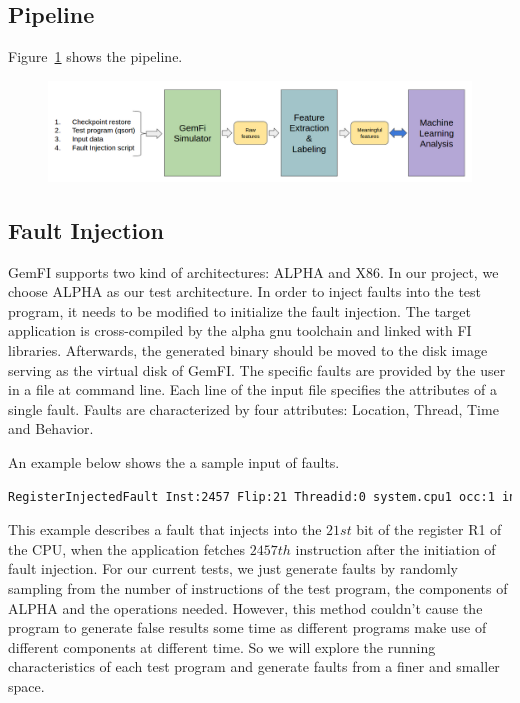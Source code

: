 \documentclass{sig-alternate}
\begin{document}
\subsection{Pipeline}
Figure~\ref{fig:pipeline} shows the pipeline.
\begin{figure}[t]
\begin{center}
   \includegraphics[width=0.95\linewidth]{./figures/pipeline.png}
\end{center}
   \caption{}
\label{fig:pipeline}
\end{figure}

\subsection{Fault Injection}
GemFI \cite{parasyris2014gemfi} supports two kind of architectures: ALPHA and X86. In our project, we choose ALPHA as our test architecture. In order to inject faults into the test program, it needs to be modified to initialize the fault injection. The target application is cross-compiled by the alpha gnu toolchain and linked with FI libraries. Afterwards, the generated binary should be moved to the disk image serving as the virtual disk of GemFI. The specific faults are provided by the user in a file at command line. Each line of the input file specifies the attributes of a single fault. Faults are characterized by four attributes: Location, Thread, Time and Behavior. 

An example below shows the a sample input of faults. 
\begin{lstlisting}[language=bash]
RegisterInjectedFault Inst:2457 Flip:21 Threadid:0 system.cpu1 occ:1 int 1
\end{lstlisting}

This example describes a fault that injects into the $21st$ bit of the register R1 of the CPU, when the application fetches $2457th$ instruction after the initiation of fault injection. For our current tests, we just generate faults by randomly sampling from the number of instructions of the test program, the components of ALPHA and the operations needed. However, this method couldn't cause the program to generate false results some time as different programs make use of different components at different time. So we will explore the running characteristics of each test program and generate faults from a finer and smaller space. 
\end{document}
